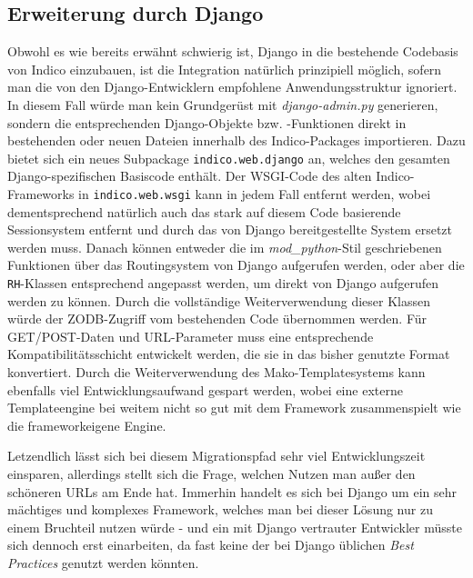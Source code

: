 \subsection{Erweiterung durch Django}
Obwohl es wie bereits erwähnt schwierig ist, Django in die bestehende Codebasis von Indico
einzubauen, ist die Integration natürlich prinzipiell möglich, sofern man die von den
Django-Entwicklern empfohlene Anwendungsstruktur ignoriert. In diesem Fall würde man kein
Grundgerüst mit \emph{django-admin.py} generieren, sondern die entsprechenden Django-Objekte bzw.
-Funktionen direkt in bestehenden oder neuen Dateien innerhalb des Indico-Packages importieren.
Dazu bietet sich ein neues Subpackage \lstinline{indico.web.django} an, welches den gesamten
Django-spezifischen Basiscode enthält. Der WSGI-Code des alten Indico-Frameworks in
\lstinline{indico.web.wsgi} kann in jedem Fall entfernt werden, wobei dementsprechend natürlich auch
das stark auf diesem Code basierende Sessionsystem entfernt und durch das von Django
bereitgestellte System ersetzt werden muss. Danach können entweder die im \emph{mod\_python}-Stil
geschriebenen Funktionen über das Routingsystem von Django aufgerufen werden, oder aber die
\lstinline{RH}-Klassen entsprechend angepasst werden, um direkt von Django aufgerufen werden zu
können. Durch die vollständige Weiterverwendung dieser Klassen würde der ZODB-Zugriff vom
bestehenden Code übernommen werden. Für GET/POST-Daten und URL-Parameter muss eine
entsprechende Kompatibilitätsschicht entwickelt werden, die sie in das bisher genutzte Format
konvertiert. Durch die Weiterverwendung des Mako-Templatesystems kann ebenfalls viel
Entwicklungsaufwand gespart werden, wobei eine externe Templateengine bei weitem nicht so
gut mit dem Framework zusammenspielt wie die frameworkeigene Engine.

Letzendlich lässt sich bei diesem Migrationspfad sehr viel Entwicklungszeit einsparen, allerdings
stellt sich die Frage, welchen Nutzen man außer den schöneren URLs am Ende hat. Immerhin handelt es
sich bei Django um ein sehr mächtiges und komplexes Framework, welches man bei dieser Lösung nur zu
einem Bruchteil nutzen würde - und ein mit Django vertrauter Entwickler müsste sich dennoch erst
einarbeiten, da fast keine der bei Django üblichen \emph{Best Practices} genutzt werden könnten.


